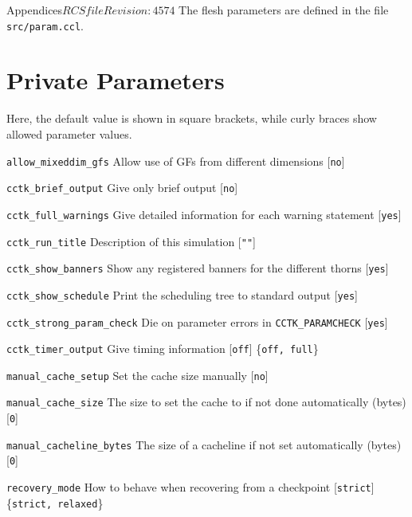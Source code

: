 \begin{cactuspart}{Appendices}{$RCSfile$}{$Revision: 4574 $}
The flesh parameters are defined in the file {\tt src/param.ccl}.

\section{Private Parameters}

Here, the default value is shown in square brackets, while curly braces show allowed parameter values.

\begin{Lentry}

\item[{\tt allow\_mixeddim\_gfs}]
Allow use of GFs from different dimensions [{\tt no}]

\item [{\tt cctk\_brief\_output}]
Give only brief output [{\tt no}]

\item[{\tt cctk\_full\_warnings}]
Give detailed information for each warning statement [{\tt yes}]

\item [{\tt cctk\_run\_title}]
Description of this simulation [{\tt ""}]

\item [{\tt cctk\_show\_banners}]
Show any registered banners for the different thorns [{\tt yes}]

\item [{\tt cctk\_show\_schedule}]
Print the scheduling tree to standard output [{\tt yes}]

\item[{\tt cctk\_strong\_param\_check}]
Die on parameter errors in {\tt CCTK\_PARAMCHECK} [{\tt yes}]

\item[{\tt cctk\_timer\_output}]
Give timing information [{\tt off}] \{{\tt off, full}\}

\item[{\tt manual\_cache\_setup}]
Set the cache size manually [{\tt no}]

\item[{\tt manual\_cache\_size}]
The size to set the cache to if not done automatically (bytes) [{\tt 0}]

\item[{\tt manual\_cacheline\_bytes}]
The size of a cacheline if not set automatically (bytes) [{\tt 0}]

\item[{\tt recovery\_mode}]
How to behave when recovering from a checkpoint [{\tt strict}] \{{\tt strict, relaxed}\}


\end{Lentry}
\end{cactuspart}
